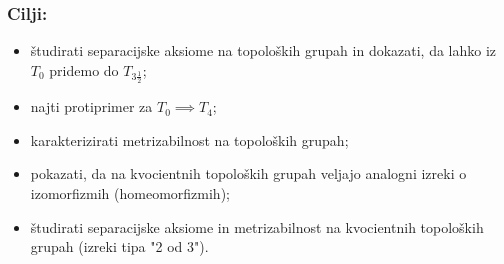 \documentclass[a4paper, 12pt]{beamer}
\begin{document}
\begin{frame}
\frametitle{Cilji:}
\begin{itemize}[label=]
\item<1-> študirati separacijske aksiome na topoloških grupah in dokazati, da lahko iz $T_0$ pridemo do $T_{3 \frac{1}{2}}$;
\item<2-> najti protiprimer za $T_0 \implies T_4$;
\item<3-> karakterizirati metrizabilnost na topoloških grupah;
\item<4-> pokazati, da na kvocientnih topoloških grupah veljajo analogni izreki o izomorfizmih (homeomorfizmih);
\item<4-> študirati separacijske aksiome in metrizabilnost na kvocientnih topoloških grupah (izreki tipa "2 od 3").
\end{itemize}
\end{frame}
\end{document}
